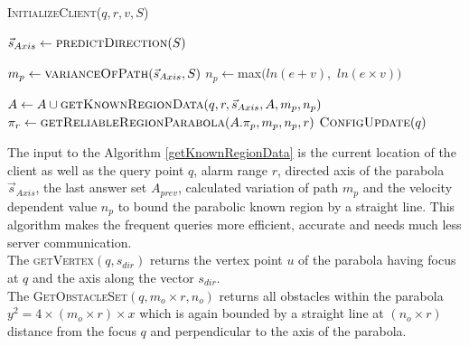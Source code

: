 \begin{algorithm}
\caption{\textsc{InitializeClient}($q, r, v, S$)}
\label{InitializeClient}
   
    
	 $\vec{s}_{Axis} \gets \textsc{predictDirection}(S)$ \;
	
	 $m_p \gets \textsc{varianceOfPath}(\vec{s}_{Axis}, S)$ \;
	 $n_p \gets $max$( ln( e + v ),$ $ln(e \times v))$ \;
	
	 $A \gets A \cup \textsc{getKnownRegionData}(q, r, \vec{s}_{Axis}, A, m_p, n_p)$ \;
	 $\pi_r \gets \textsc{getReliableRegionParabola}(A.\pi_p,m_p,n_p,r)$ \;
	 $\textsc{ConfigUpdate}(q)$\;
	 
\end{algorithm}
\vspace{5pt}


The input to the Algorithm \ref{getKnownRegionData} is the current location of the client as well as the query point $q$, alarm range $r$, directed axis of the parabola $\vec{s}_{Axis}$, the last answer set $A_{prev}$, calculated variation of path $m_p$ and the velocity dependent value $n_p$ to bound the parabolic known region by a straight line. This algorithm makes the frequent queries more efficient, accurate and needs much less server communication.\\



The \textsc{getVertex}$(q, s_{dir})$ returns the vertex point $u$ of the parabola having focus at $q$ and the axis along the vector $s_{dir}$.\\

The \textsc{GetObstacleSet}$(q, m_o \times r, n_o)$ returns all obstacles within the parabola $y^2 = 4 \times (m_o \times r) \times x$ which is again bounded by a straight line at $(n_o \times r)$ distance from the focus $q$ and perpendicular to the axis of the parabola.\\


